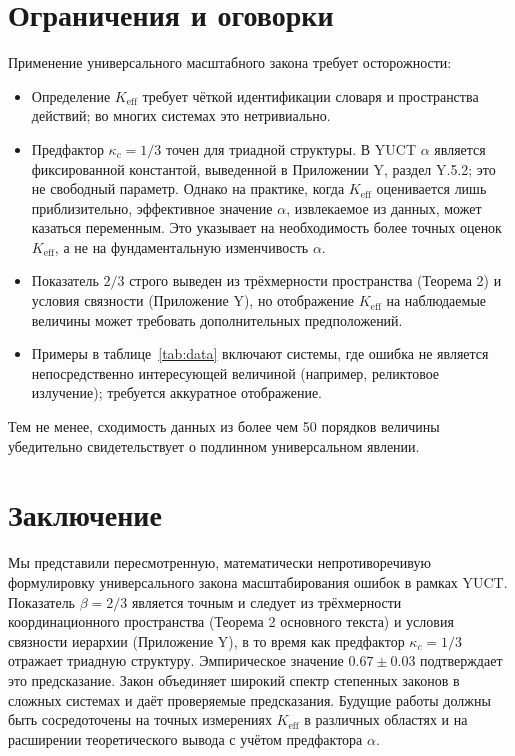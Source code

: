 \documentclass[12pt]{article}
\newcommand{\Keff}{K_{\mathrm{eff}}}
\newcommand{\kappac}{\kappa_c}
\begin{document}
	\section{Ограничения и оговорки}
	\label{sec:limitations}
	
	Применение универсального масштабного закона требует осторожности:
	\begin{itemize}
		\item Определение \(\Keff\) требует чёткой идентификации словаря и пространства действий; во многих системах это нетривиально.
		\item Предфактор \(\kappac = 1/3\) точен для триадной структуры. В YUCT \(\alpha\) является фиксированной константой, выведенной в Приложении Y, раздел Y.5.2; это не свободный параметр. Однако на практике, когда \(\Keff\) оценивается лишь приблизительно, эффективное значение \(\alpha\), извлекаемое из данных, может казаться переменным. Это указывает на необходимость более точных оценок \(\Keff\), а не на фундаментальную изменчивость \(\alpha\).
		\item Показатель \(2/3\) строго выведен из трёхмерности пространства (Теорема 2) и условия связности (Приложение Y), но отображение \(\Keff\) на наблюдаемые величины может требовать дополнительных предположений.
		\item Примеры в таблице~\ref{tab:data} включают системы, где ошибка не является непосредственно интересующей величиной (например, реликтовое излучение); требуется аккуратное отображение.
	\end{itemize}
	
	Тем не менее, сходимость данных из более чем 50 порядков величины убедительно свидетельствует о подлинном универсальном явлении.
	
	\section{Заключение}
	Мы представили пересмотренную, математически непротиворечивую формулировку универсального закона масштабирования ошибок в рамках YUCT. Показатель \(\beta = 2/3\) является точным и следует из трёхмерности координационного пространства (Теорема 2 основного текста) и условия связности иерархии (Приложение Y), в то время как предфактор \(\kappac = 1/3\) отражает триадную структуру. Эмпирическое значение \(0.67 \pm 0.03\) подтверждает это предсказание. Закон объединяет широкий спектр степенных законов в сложных системах и даёт проверяемые предсказания. Будущие работы должны быть сосредоточены на точных измерениях \(\Keff\) в различных областях и на расширении теоретического вывода с учётом предфактора \(\alpha\).
	
\end{document}
